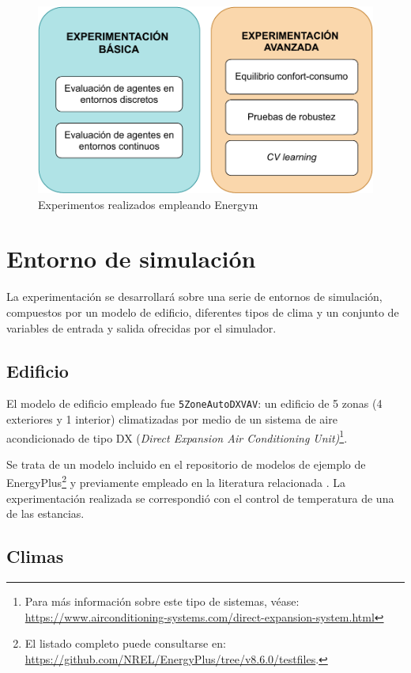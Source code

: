 \begin{figure}
    \centering
    \includegraphics[width=\textwidth]{imagenes/metodologia.pdf}
    \caption{Experimentos realizados empleando Energym}
    \label{fig:metodologia}
\end{figure}

\section{Entorno de simulación}

La experimentación se desarrollará sobre una serie de entornos de simulación, compuestos por un modelo de edificio, diferentes tipos de clima y un conjunto de variables de entrada y salida ofrecidas por el simulador.

\subsection{Edificio}

El modelo de edificio empleado fue \texttt{5ZoneAutoDXVAV}: un edificio de 5 zonas (4 exteriores y 1 interior) climatizadas por medio de un sistema de aire acondicionado de tipo DX (\textit{Direct Expansion Air Conditioning Unit)}\footnote{Para más información sobre este tipo de sistemas, véase: \url{https://www.airconditioning-systems.com/direct-expansion-system.html}}. 

Se trata de un modelo incluido en el repositorio de modelos de ejemplo de EnergyPlus\footnote{El listado completo puede consultarse en: \url{https://github.com/NREL/EnergyPlus/tree/v8.6.0/testfiles}.} y previamente empleado en la literatura relacionada \cite{zhang2018practical}. La experimentación realizada se correspondió con el control de temperatura de una de las estancias.

\subsection{Climas}

